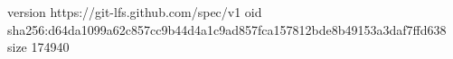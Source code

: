 version https://git-lfs.github.com/spec/v1
oid sha256:d64da1099a62c857cc9b44d4a1c9ad857fca157812bde8b49153a3daf7ffd638
size 174940
